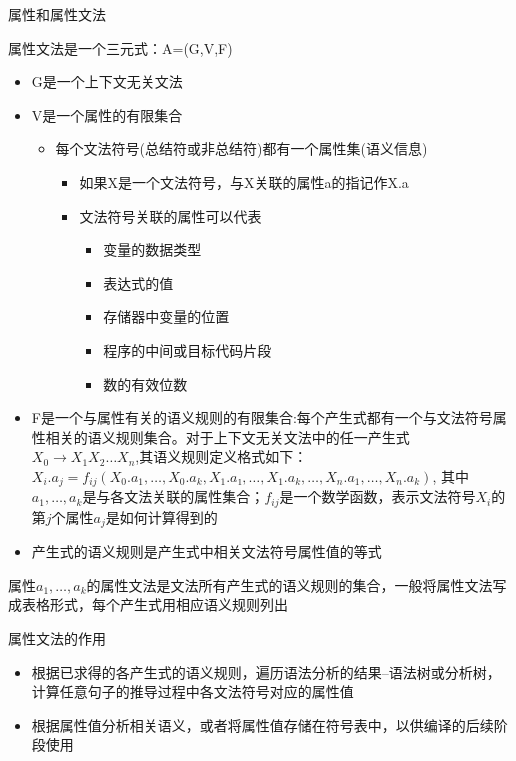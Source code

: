\documentclass[utf8]{ctexart}
\begin{document}
属性和属性文法

属性文法是一个三元式：A=(G,V,F)
\begin{itemize}
    \item G是一个上下文无关文法
    \item V是一个属性的有限集合
    \begin{itemize}
        \item 每个文法符号(总结符或非总结符)都有一个属性集(语义信息)
        \begin{itemize}
            \item 如果X是一个文法符号，与X关联的属性a的指记作X.a
            \item 文法符号关联的属性可以代表
            \begin{itemize}
                \item 变量的数据类型
                \item 表达式的值
                \item 存储器中变量的位置
                \item 程序的中间或目标代码片段
                \item 数的有效位数
            \end{itemize}
        \end{itemize} 
    \end{itemize}
    \item F是一个与属性有关的语义规则的有限集合:每个产生式都有一个与文法符号属性相关的语义规则集合。对于上下文无关文法中的任一产生式
          $X_0 \rightarrow X_1X_2\dots X_n$,其语义规则定义格式如下：
          $X_i.a_j=f_{ij}(X_0.a_1,\dots,X_0.a_{k}, X_1.a₁,\dots,X_1.a_k,\dots,X_n.a_1,\dots,X_n.a_k)$,
          其中$a_1,\dots,a_k$是与各文法关联的属性集合；$f_{ij}$是一个数学函数，表示文法符号$X_i$的第$j$个属性$a_j$是如何计算得到的
    \item   产生式的语义规则是产生式中相关文法符号属性值的等式
\end{itemize}

属性$a_1,\dots,a_k$的属性文法是文法所有产生式的语义规则的集合，一般将属性文法写成表格形式，每个产生式用相应语义规则列出

\noindent 属性文法的作用
\begin{itemize}
    \item 根据已求得的各产生式的语义规则，遍历语法分析的结果--语法树或分析树，计算任意句子的推导过程中各文法符号对应的属性值
    \item 根据属性值分析相关语义，或者将属性值存储在符号表中，以供编译的后续阶段使用
\end{itemize}
\end{document}
